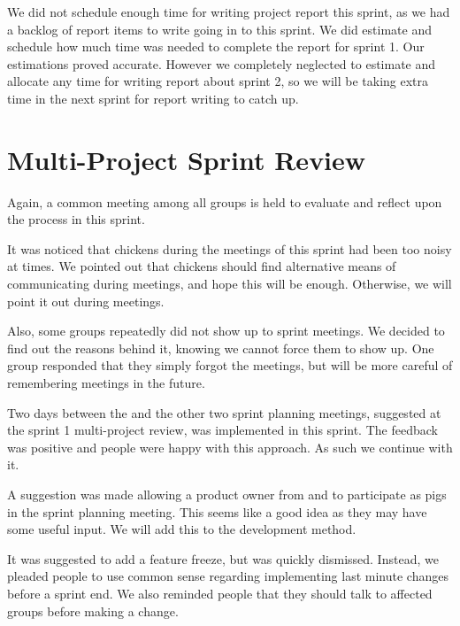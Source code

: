 We did not schedule enough time for writing project report this sprint, as we had a backlog of report items to write going in to this sprint. We did estimate and schedule how much time was needed to complete the report for sprint 1. Our estimations proved accurate. However we completely neglected to estimate and allocate any time for writing report about sprint 2, so we will be taking extra time in the next sprint for report writing to catch up.


\section{Multi-Project Sprint Review}\label{sec:s2_multiprj_review}
Again, a common meeting among all groups is held to evaluate and reflect upon the process in this sprint.

It was noticed that chickens during the meetings of this sprint had been too noisy at times. We pointed out that chickens should find alternative means of communicating during meetings, and hope this will be enough. Otherwise, we will point it out during meetings.

Also, some groups repeatedly did not show up to sprint meetings. We decided to find out the reasons behind it, knowing we cannot force them to show up. One group responded that they simply forgot the meetings, but will be more careful of remembering meetings in the future.

Two days between the \gui and the other two sprint planning meetings, suggested at the sprint 1 multi-project review, was implemented in this sprint. The feedback was positive and people were happy with this approach. As such we continue with it.

A suggestion was made allowing a product owner from \db and \bd to participate as pigs in the \gui sprint planning meeting. This seems like a good idea as they may have some useful input. We will add this to the development method.

It was suggested to add a feature freeze, but was quickly dismissed. Instead, we pleaded people to use common sense regarding implementing last minute changes before a sprint end. We also reminded people that they should talk to affected groups before making a change.